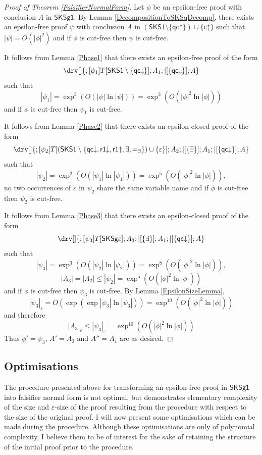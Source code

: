 \documentclass[10pt]{article}
\theoremstyle{definition}\newtheorem{remark}[theorem]{Remark}
\theoremstyle{definition}\newtheorem{example}[theorem]{Example}
\theoremstyle{definition}\newtheorem{definition}[theorem]{Definition}
\newcommand{\SKSq}{{\mathsf{SKSg1}}}
\newcommand{\SKSqDecomp}{{\mathsf{SKS1}}}
\newcommand{\FalsifierCalculus}{{\mathsf{SKSg\varepsilon}}}
\newcommand{\cUp}{{\mathsf{c\mathord\uparrow}}}
\newcommand{\qcUp}{{\mathsf{qc\mathord\uparrow}}}
\newcommand{\qcDown}{{\mathsf{qc\mathord\downarrow}}}
\newcommand{\rOneUp}{{\mathsf{r1\mathord\uparrow}}}
\newcommand{\rOneDown}{{\mathsf{r1\mathord\downarrow}}}
\newcommand{\falsifierRule}{{\mathsf{\varepsilon}}}
\newcommand{\eqExists}{=_{\exists}}
\begin{document}
	\begin{proof}[Proof of Theorem \ref{FalsifierNormalForm}]
		Let $\phi$ be an epsilon-free proof with conclusion $A$ in $\SKSq$. By Lemma \ref{DecompositionToSKSqDecomp}, there exists an epsilon-free proof $\psi$ with conclusion $A$ in $(\SKSqDecomp \setminus \{\qcUp\}) \cup \{\cUp\}$ such that $| \psi | = O(| \phi |^2)$ and if $\phi$ is cut-free then $\psi$ is cut-free.
		
		It follows from Lemma \ref{Phase1} that there exists an epsilon-free proof of the form
		\[
		\drv[] {
			; [\psi_1]T[\SKSqDecomp \setminus \{\qcDown\}] ; A_1 ; |[\{\qcDown\}] ; A
		}
		\]
		such that
		\[
			| \psi_1 | = \exp^3 (O(| \psi | \ln | \psi |)) = \exp^3 (O(| \phi |^2 \ln | \phi |))
		\]
		and if $\phi$ is cut-free then $\psi_1$ is cut-free.
		
		It follows from Lemma \ref{Phase2} that there exists an epsilon-closed proof of the form
		\[
		\drv[] {
			; [\psi_2]T[(\SKSqDecomp \setminus \{\qcDown, \rOneDown, \rOneUp, \exists, \eqExists\}) \cup \{\falsifierRule\}] ; A_2 ; |[\{\exists\}] ; A_1 ; |[\{\qcDown\}] ; A
		}
		\]
		such that
		\[
			| \psi_2 | = \exp^2 (O(| \psi_1 | \ln | \psi_1 |)) = \exp^5 (O(| \phi |^2 \ln | \phi |)),
		\]
		no two occurrences of $\falsifierRule$ in $\psi_2$ share the same variable name and if $\phi$ is cut-free then $\psi_2$ is cut-free.
		
		It follows from Lemma \ref{Phase3} that there exists an epsilon-closed proof of the form
		\[
		\drv[] {
			; [\psi_3]T[\FalsifierCalculus] ; A_3 ; |[\{\exists\}] ; A_1 ; |[\{\qcDown\}] ; A
		}
		\]
		such that
		\[
			| \psi_3 | = \exp^3 (O(| \psi_2 | \ln | \psi_2 |)) = \exp^8 (O(| \phi |^2 \ln | \phi |)),
		\]
		\[
			| A_3 | = | A_2 | \leq | \psi_2 | = \exp^5 (O(| \phi |^2 \ln | \phi |))
		\]
		and if $\phi$ is cut-free then $\psi_3$ is cut-free. By Lemma \ref{EpsilonSizeLemma},
		\[
			| \psi_3 |_\varepsilon = O(\exp (\exp | \psi_3 | \ln | \psi_3 |)) = \exp^{10} (O(| \phi |^2 \ln | \phi |))
		\]
		and therefore
		\[
			| A_3 |_\varepsilon \leq | \psi_3 |_\varepsilon = \exp^{10} (O(| \phi |^2 \ln | \phi |))
		\]
		Thus $\phi' = \psi_3$, $A' = A_3$ and $A'' = A_1$ are as desired.
	\end{proof}
	
	\subsection{Optimisations}\label{OptimisationsSection}
	
	The procedure presented above for transforming an epsilon-free proof in $\SKSq$ into falsifier normal form is not optimal, but demonstrates elementary complexity of the size and $\varepsilon$-size of the proof resulting from the procedure with respect to the size of the original proof. I will now present some optimisations which can be made during the procedure. Although these optimisations are only of polynomial complexity, I believe them to be of interest for the sake of retaining the structure of the initial proof prior to the procedure.
	
\end{document}

